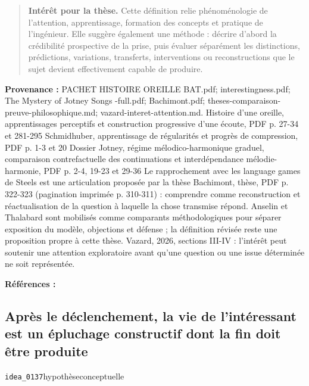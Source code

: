 \documentclass[10pt,a4paper]{article}
\begin{document}
\begin{quote}
\textbf{Intérêt pour la thèse.} Cette définition relie phénoménologie de l'attention, apprentissage, formation des concepts et pratique de l'ingénieur. Elle suggère également une méthode : décrire d'abord la crédibilité prospective de la prise, puis évaluer séparément les distinctions, prédictions, variations, transferts, interventions ou reconstructions que le sujet devient effectivement capable de produire.
\end{quote}
{\footnotesize\color{metadata}\textbf{Provenance :} PACHET HISTOIRE OREILLE BAT.pdf; interestingness.pdf; The Mystery of Jotney Songs -full.pdf; Bachimont.pdf; theses-comparaison-preuve-philosophique.md; vazard-interet-attention.md. Histoire d'une oreille, apprentissages perceptifs et construction progressive d'une écoute, PDF p. 27-34 et 281-295 Schmidhuber, apprentissage de régularités et progrès de compression, PDF p. 1-3 et 20 Dossier Jotney, régime mélodico-harmonique graduel, comparaison contrefactuelle des continuations et interdépendance mélodie-harmonie, PDF p. 2-4, 19-23 et 29-36 Le rapprochement avec les language games de Steels est une articulation proposée par la thèse Bachimont, thèse, PDF p. 322-323 (pagination imprimée p. 310-311) : comprendre comme reconstruction et réactualisation de la question à laquelle la chose transmise répond. Anselin et Thalabard sont mobilisés comme comparants méthodologiques pour séparer exposition du modèle, objections et défense ; la définition révisée reste une proposition propre à cette thèse. Vazard, 2026, sections III-IV : l'intérêt peut soutenir une attention exploratoire avant qu'une question ou une issue déterminée ne soit représentée.\par}
{\footnotesize\color{metadata}\textbf{Références :} \parencite{pachet2018oreille,schmidhuber1997interesting,steels2005coordinating,steels2015talkingheads,bachimont1996hermeneutique,anselin2021attention,thalabard2012attention,vazard2026inquiry}\par}

\subsection{Après le déclenchement, la vie de l'intéressant est un épluchage constructif dont la fin doit être produite}
{\small\color{metadata} \texttt{idea\_0137}\quad\textbullet\quad hypothèse\quad\textbullet\quad conceptuelle\par}
\end{document}

